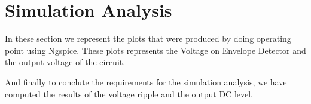 \section{Simulation Analysis}
\label{sec:simulation} 

In these section we represent the plots that were produced by doing operating point using Ngspice. These plots represents the Voltage on Envelope Detector and the output voltage of the circuit.


And finally to conclute the requirements for the simulation analysis, we have computed the results of the voltage ripple and the output DC level. 

